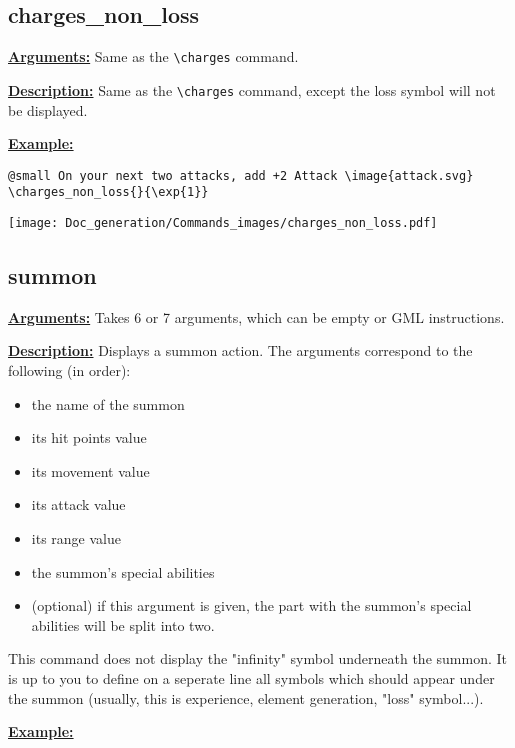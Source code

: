 \documentclass{article}
\begin{document}
\subsection{charges\_non\_loss}
\textbf{\underline{Arguments:}} Same as the \verb`\charges` command.

\textbf{\underline{Description:}} Same as the \verb`\charges` command, except the loss symbol will not be displayed.

\textbf{\underline{Example:}}

\begin{center}
\begin{BVerbatim}
@small On your next two attacks, add +2 Attack \image{attack.svg}
\charges_non_loss{}{\exp{1}}
\end{BVerbatim}
\end{center}

\begin{center}
\texttt{[image: Doc\_generation/Commands\_images/charges\_non\_loss.pdf]}
\end{center}

\subsection{summon}
\textbf{\underline{Arguments:}} Takes 6 or 7 arguments, which can be empty or GML instructions.

\textbf{\underline{Description:}} Displays a summon action. The arguments correspond to the following (in order):
\begin{itemize}
	\item the name of the summon
	\item its hit points value
	\item its movement value
	\item its attack value
	\item its range value
	\item the summon's special abilities
	\item (optional) if this argument is given, the part with the summon's special abilities will be split into two.
\end{itemize}



This command does not display the "infinity" symbol underneath the summon. It is up to you to define on a seperate line all symbols which should appear under the summon (usually, this is experience, element generation, "loss" symbol...).

\textbf{\underline{Example:}}
\end{document}
